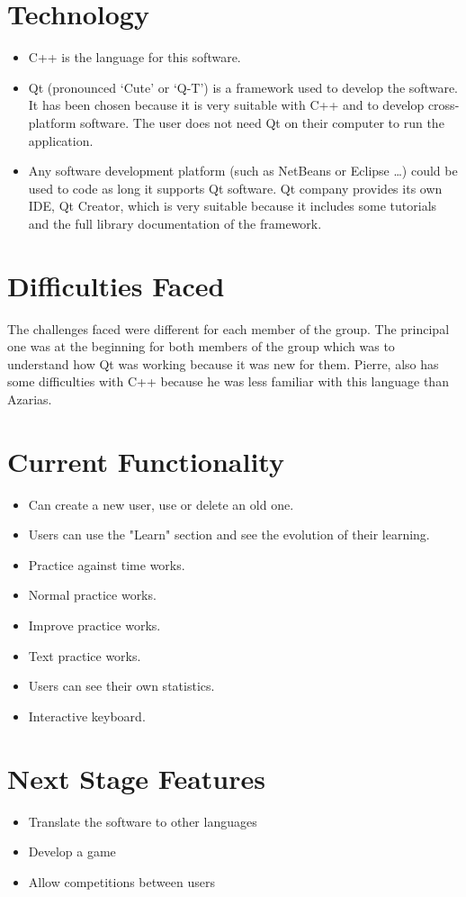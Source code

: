 \section{Technology}
\begin{itemize}
    \item C++ is the language for this software.
    \item Qt (pronounced ‘Cute’ or ‘Q-T’) is a framework used to develop the software. It has been chosen because it is very suitable with C++ and to develop cross-platform software. The user does not need Qt on their computer to run the application. 
    \item Any software development platform (such as NetBeans or Eclipse …) could be used to code as long it supports Qt software. Qt company provides its own IDE, Qt Creator, which is very suitable because it includes some tutorials and the full library documentation of the framework. 
\end{itemize}

\section{Difficulties Faced}
The challenges faced were different for each member of the group. The principal one was at the beginning for both members of the group which was to understand how Qt was working because it was new for them. Pierre, also has some difficulties with C++ because he was less familiar with this language than Azarias. 

\section{Current Functionality}
\begin{itemize}
\item Can create a new user, use or delete an old one.
\item Users can use the "Learn" section and see the evolution of their learning.
\item Practice against time works.
\item Normal practice works.
\item Improve practice works.
\item Text practice works.
\item Users can see their own statistics.
\item Interactive keyboard.
\end{itemize}

\section{Next Stage Features}
\begin{itemize}
\item Translate the software to other languages
\item Develop a game
\item Allow competitions between users
\end{itemize}

